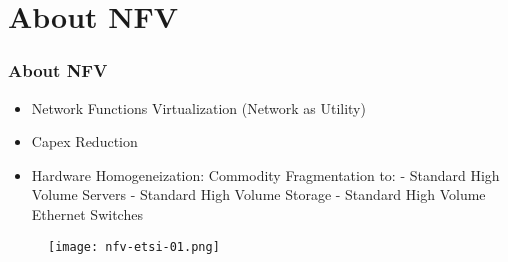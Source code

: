 \section{About NFV}

\begin{frame}[allowframebreaks]

\frametitle{About NFV}

\begin{itemize}
 \item Network Functions Virtualization (Network as Utility)
 \item Capex Reduction
 \item Hardware Homogeneization: Commodity Fragmentation to:\linebreak
	- Standard High Volume Servers\linebreak
	- Standard High Volume Storage\linebreak
	- Standard High Volume Ethernet Switches
\end{itemize}

\begin{center}
  \begin{figure}
    \texttt{[image: nfv-etsi-01.png]}
  \end{figure}
\end{center}

\end{frame}
